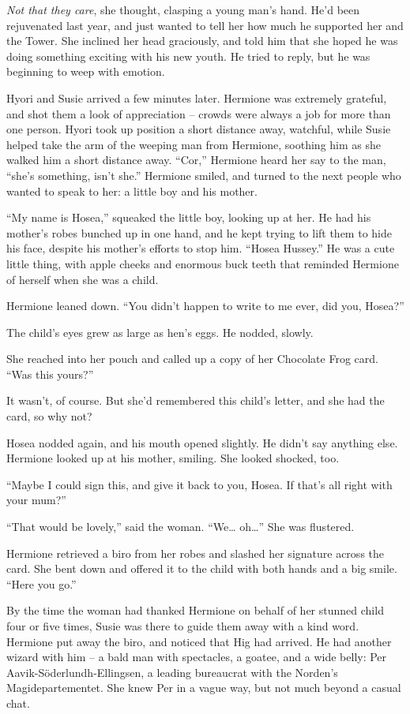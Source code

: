 \emph{Not that they care}, she thought, clasping a young man's hand.
He'd been rejuvenated last year, and just wanted to tell her how much he
supported her and the Tower. She inclined her head graciously, and told
him that she hoped he was doing something exciting with his new youth.
He tried to reply, but he was beginning to weep with emotion.

Hyori and Susie arrived a few minutes later. Hermione was extremely
grateful, and shot them a look of appreciation -- crowds were always a
job for more than one person. Hyori took up position a short distance
away, watchful, while Susie helped take the arm of the weeping man from
Hermione, soothing him as she walked him a short distance away. ``Cor,''
Hermione heard her say to the man, ``she's something, isn't she.''
Hermione smiled, and turned to the next people who wanted to speak to
her: a little boy and his mother.

``My name is Hosea,'' squeaked the little boy, looking up at her. He had
his mother's robes bunched up in one hand, and he kept trying to lift
them to hide his face, despite his mother's efforts to stop him. ``Hosea
Hussey.'' He was a cute little thing, with apple cheeks and enormous
buck teeth that reminded Hermione of herself when she was a child.

Hermione leaned down. ``You didn't happen to write to me ever, did you,
Hosea?''

The child's eyes grew as large as hen's eggs. He nodded, slowly.

She reached into her pouch and called up a copy of her Chocolate Frog
card. ``Was this yours?''

It wasn't, of course. But she'd remembered this child's letter, and she
had the card, so why not?

Hosea nodded again, and his mouth opened slightly. He didn't say
anything else. Hermione looked up at his mother, smiling. She looked
shocked, too.

``Maybe I could sign this, and give it back to you, Hosea. If that's all
right with your mum?''

``That would be lovely,'' said the woman. ``We\ldots{} oh\ldots{}'' She
was flustered.

Hermione retrieved a biro from her robes and slashed her signature
across the card. She bent down and offered it to the child with both
hands and a big smile. ``Here you go.''

By the time the woman had thanked Hermione on behalf of her stunned
child four or five times, Susie was there to guide them away with a kind
word. Hermione put away the biro, and noticed that Hig had arrived. He
had another wizard with him -- a bald man with spectacles, a goatee, and
a wide belly: Per Aavik-Söderlundh-Ellingsen, a leading bureaucrat with
the Norden's Magidepartementet. She knew Per in a vague way, but not
much beyond a casual chat.

